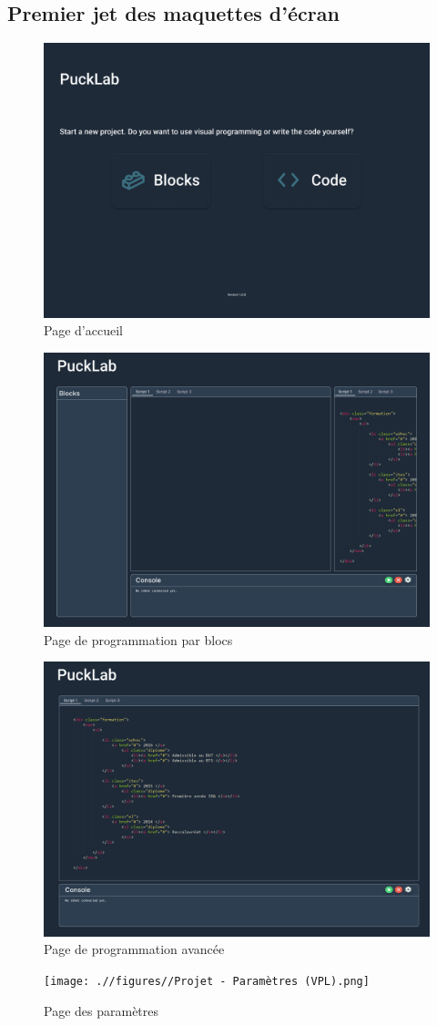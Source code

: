 \subsection{Premier jet des maquettes d'écran} \label{sec:écrans_v1}

\begin{figure}[H]
    \centering
    \includegraphics[width=0.75\linewidth]{.//figures//Lancement.png}
    \caption{\label{fig:v1_homepage} Page d'accueil}
\end{figure}

\begin{figure}[H]
    \centering
    \includegraphics[width=0.75\linewidth]{.//figures//Projet - VPL.png}
    \caption{\label{fig:v1_vpl_page} Page de programmation par blocs}
\end{figure}

\begin{figure}[H]
    \centering
    \includegraphics[width=0.75\linewidth]{.//figures//Projet - IDE.png}
    \caption{\label{fig:v1_ide_page} Page de programmation avancée}
\end{figure}

\begin{figure}[H]
    \centering
    \texttt{[image: .//figures//Projet - Paramètres (VPL).png]}
    \caption{\label{fig:v1_settings_page} Page des paramètres}
\end{figure}

